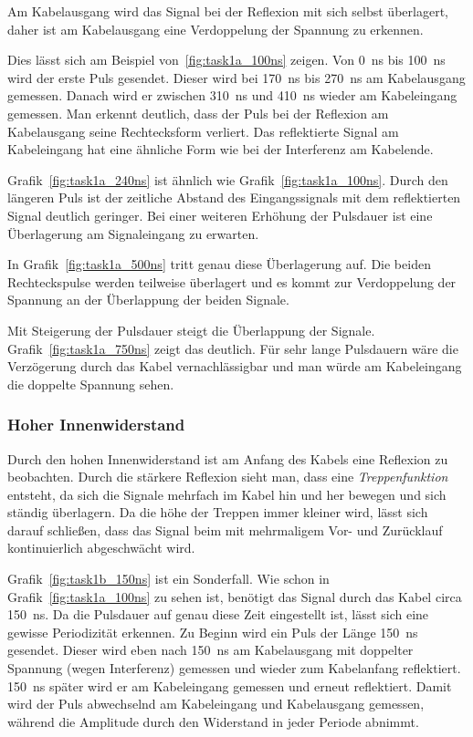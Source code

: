 \documentclass{article}
\begin{document}
Am Kabelausgang wird das Signal bei der Reflexion mit sich selbst überlagert, daher ist am Kabelausgang eine Verdoppelung der Spannung zu erkennen.

Dies lässt sich am Beispiel von~\ref{fig:task1a_100ns} zeigen. Von 0~ns bis 100~ns wird der erste Puls gesendet. Dieser wird bei 170~ns bis 270~ns am Kabelausgang gemessen. Danach wird er zwischen 310~ns und 410~ns wieder am Kabeleingang gemessen. Man erkennt deutlich, dass der Puls bei der Reflexion am Kabelausgang seine Rechtecksform verliert. Das reflektierte Signal am Kabeleingang hat eine ähnliche Form wie bei der Interferenz am Kabelende.


Grafik~\ref{fig:task1a_240ns} ist ähnlich wie Grafik~\ref{fig:task1a_100ns}. Durch den längeren Puls ist der zeitliche Abstand des Eingangssignals mit dem reflektierten Signal deutlich geringer. Bei einer weiteren Erhöhung der Pulsdauer ist eine Überlagerung am Signaleingang zu erwarten.

In Grafik~\ref{fig:task1a_500ns} tritt genau diese Überlagerung auf. Die beiden Rechteckspulse werden teilweise überlagert und es kommt zur Verdoppelung der Spannung an der Überlappung der beiden Signale.

Mit Steigerung der Pulsdauer steigt die Überlappung der Signale. Grafik~\ref{fig:task1a_750ns} zeigt das deutlich. Für sehr lange Pulsdauern wäre die Verzögerung durch das Kabel vernachlässigbar und man würde am Kabeleingang die doppelte Spannung sehen.


\subsubsection{Hoher Innenwiderstand}

Durch den hohen Innenwiderstand ist am Anfang des Kabels eine Reflexion zu beobachten. Durch die stärkere Reflexion sieht man, dass eine \textit{Treppenfunktion} entsteht, da sich die Signale mehrfach im Kabel hin und her bewegen und sich ständig überlagern. Da die höhe der Treppen immer kleiner wird, lässt sich darauf schließen, dass das Signal beim mit mehrmaligem Vor- und Zurücklauf kontinuierlich abgeschwächt wird.

Grafik~\ref{fig:task1b_150ns} ist ein Sonderfall. Wie schon in Grafik~\ref{fig:task1a_100ns} zu sehen ist, benötigt das Signal durch das Kabel circa 150~ns. Da die Pulsdauer auf genau diese Zeit eingestellt ist, lässt sich eine gewisse Periodizität erkennen. Zu Beginn wird ein Puls der Länge 150~ns gesendet. Dieser wird eben nach 150~ns am Kabelausgang mit doppelter Spannung (wegen Interferenz) gemessen und wieder zum Kabelanfang reflektiert. 150~ns später wird er am Kabeleingang gemessen und erneut reflektiert. Damit wird der Puls abwechselnd am Kabeleingang und Kabelausgang gemessen, während die Amplitude durch den Widerstand in jeder Periode abnimmt.
\end{document}
